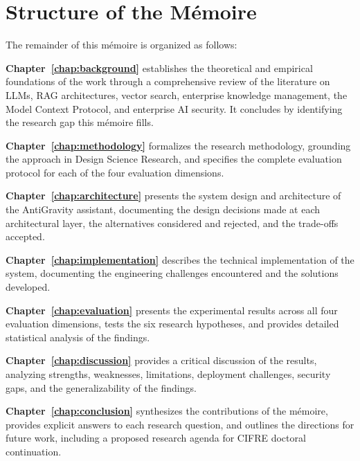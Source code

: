 \section{Structure of the Mémoire}
\label{sec:intro-structure}

The remainder of this mémoire is organized as follows:

\textbf{Chapter~\ref{chap:background}} establishes the theoretical and empirical foundations of the work through a comprehensive review of the literature on LLMs, RAG architectures, vector search, enterprise knowledge management, the Model Context Protocol, and enterprise AI security. It concludes by identifying the research gap this mémoire fills.

\textbf{Chapter~\ref{chap:methodology}} formalizes the research methodology, grounding the approach in Design Science Research, and specifies the complete evaluation protocol for each of the four evaluation dimensions.

\textbf{Chapter~\ref{chap:architecture}} presents the system design and architecture of the AntiGravity assistant, documenting the design decisions made at each architectural layer, the alternatives considered and rejected, and the trade-offs accepted.

\textbf{Chapter~\ref{chap:implementation}} describes the technical implementation of the system, documenting the engineering challenges encountered and the solutions developed.

\textbf{Chapter~\ref{chap:evaluation}} presents the experimental results across all four evaluation dimensions, tests the six research hypotheses, and provides detailed statistical analysis of the findings.

\textbf{Chapter~\ref{chap:discussion}} provides a critical discussion of the results, analyzing strengths, weaknesses, limitations, deployment challenges, security gaps, and the generalizability of the findings.

\textbf{Chapter~\ref{chap:conclusion}} synthesizes the contributions of the mémoire, provides explicit answers to each research question, and outlines the directions for future work, including a proposed research agenda for CIFRE doctoral continuation.

